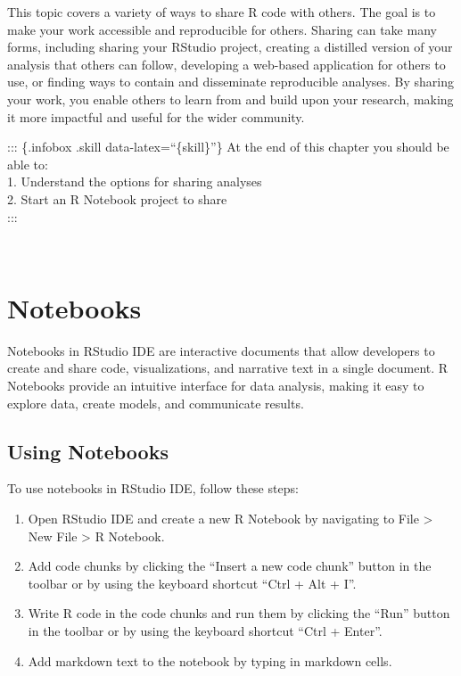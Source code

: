 \documentclass[
]{book}
\providecommand{\tightlist}{%
  \setlength{\itemsep}{0pt}\setlength{\parskip}{0pt}}
\begin{document}
This topic covers a variety of ways to share R code with others. The goal is to make your work accessible and reproducible for others. Sharing can take many forms, including sharing your RStudio project, creating a distilled version of your analysis that others can follow, developing a web-based application for others to use, or finding ways to contain and disseminate reproducible analyses. By sharing your work, you enable others to learn from and build upon your research, making it more impactful and useful for the wider community.

\hfill\break
::: \{.infobox .skill data-latex=``\{skill\}''\}
At the end of this chapter you should be able to:\\
1. Understand the options for sharing analyses\\
2. Start an R Notebook project to share\\
:::\\
\strut \\

\hypertarget{notebooks}{%
\section{Notebooks}\label{notebooks}}

Notebooks in RStudio IDE are interactive documents that allow developers to create and share code, visualizations, and narrative text in a single document. R Notebooks provide an intuitive interface for data analysis, making it easy to explore data, create models, and communicate results.

\hypertarget{using-notebooks}{%
\subsection*{Using Notebooks}\label{using-notebooks}}

To use notebooks in RStudio IDE, follow these steps:

\begin{enumerate}
\def\labelenumi{\arabic{enumi}.}
\tightlist
\item
  Open RStudio IDE and create a new R Notebook by navigating to File \textgreater{} New File \textgreater{} R Notebook.
\item
  Add code chunks by clicking the ``Insert a new code chunk'' button in the toolbar or by using the keyboard shortcut ``Ctrl + Alt + I''.
\item
  Write R code in the code chunks and run them by clicking the ``Run'' button in the toolbar or by using the keyboard shortcut ``Ctrl + Enter''.
\item
  Add markdown text to the notebook by typing in markdown cells.
\end{enumerate}
\end{document}
